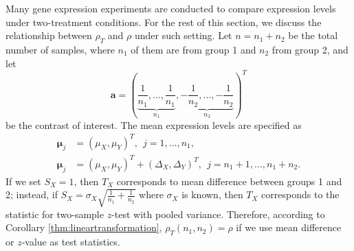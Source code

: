 \documentclass[review]{elsarticle}
\begin{document}
Many gene expression experiments are conducted to compare expression levels under two-treatment 
conditions. For the rest of this section, we discuss the relationship between $\rho_T$ and 
$\rho$ under such setting.
Let $n = n_1 + n_2$ be the total number of samples, where $n_1$ of them are from group 1 and 
$n_2$ from group 2, and let
\begin{equation}\label{eq:contrast}
\bm a  = (\underbrace{\frac{1}{n_1}, \ldots, \frac{1}{n_1}}_{n_1}, \underbrace{-\frac{1}{n_2}, 
	\ldots, -\frac{1}{n_2}}_{n_2})^T
\end{equation}
be the contrast of interest. 
The mean expression levels are specified as 
\begin{equation}\label{eq:meanTwogroup}
\begin{aligned}
\bm \mu_j &= (\mu_X, \mu_Y)^T,~~ j = 1, \ldots, n_1, \\
\bm \mu_j &= (\mu_X,  \mu_Y)^T  + ( \Delta_X,\Delta_Y)^T, ~~j = n_1 + 1, \ldots, n_1 + n_2.
\end{aligned}
\end{equation}
If we set $S_X=1$, then $T_X$ corresponds to mean difference between groups 1 and 2; instead, 
if $S_X = \sigma_X\sqrt{\frac{1}{n_1} + \frac{1}{n_2}}$ where $\sigma_X$ is known, then $T_X$ 
corresponds to the statistic for two-sample $z$-test with pooled variance. Therefore, according to Corollary 
\ref{thm:lineartransformation},  $\rho_T(n_1,n_2)=\rho$ if we use mean difference or $z$-value as 
test 
statistics.
\end{document}
